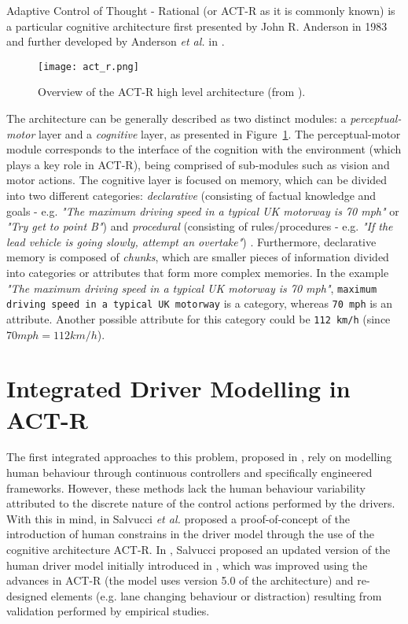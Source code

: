 Adaptive Control of Thought - Rational (or ACT-R as it is commonly known) is a particular cognitive architecture first presented by John R. Anderson in 1983 \cite{actr_1} and further developed by Anderson \textit{et al.} in \cite{actr_2}. 

\begin{figure}[h]
    \centering
    \texttt{[image: act\_r.png]}
    \caption{Overview of the ACT-R high level architecture (from \cite{actr_4}).}
    \label{fig:act_r_1}
\end{figure}

The architecture can be generally described as two distinct modules: a \textit{perceptual-motor} layer and a \textit{cognitive} layer, as presented in Figure~\ref{fig:act_r_1}. The perceptual-motor module corresponds to the interface of the cognition with the environment (which plays a key role in ACT-R), being comprised of sub-modules such as vision and motor actions. The cognitive layer is focused on memory, which can be divided into two different categories: \textit{declarative} (consisting of factual knowledge and goals - e.g. \textit{"The maximum driving speed in a typical UK motorway is 70 mph"} or \textit{"Try get to point B"}) and \textit{procedural} (consisting of rules/procedures - e.g. \textit{"If the lead vehicle is going slowly, attempt an overtake"}) \cite{actr_4}. Furthermore, declarative memory is composed of \textit{chunks}, which are smaller pieces of information divided into categories or attributes that form more complex memories. In the example \textit{"The maximum driving speed in a typical UK motorway is 70 mph"}, \texttt{maximum driving speed in a typical UK motorway} is a category, whereas \texttt{70 mph} is an attribute. Another possible attribute for this category could be \texttt{112 km/h} (since $70 mph = 112 km/h$).

\section{Integrated Driver Modelling in ACT-R}
\label{sec:salvucci}

The first integrated approaches to this problem, proposed in \cite{older_1,older_2,older_3}, rely on modelling human behaviour through continuous controllers and specifically engineered frameworks. However, these methods lack the human behaviour variability attributed to the discrete nature of the control actions performed by the drivers. With this in mind, in \cite{salvucci_0} Salvucci \textit{et al.} proposed a proof-of-concept of the introduction of human constrains in the driver model through the use of the cognitive architecture ACT-R. In \cite{salvucci_1}, Salvucci proposed an updated version of the human driver model initially introduced in \cite{salvucci_0}, which was improved using the advances in ACT-R (the model uses version 5.0 of the architecture) and re-designed elements (e.g. lane changing behaviour or distraction) resulting from validation performed by empirical studies.

